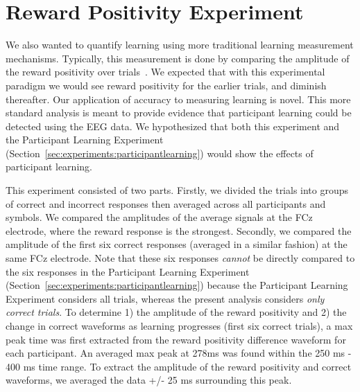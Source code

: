 \section{Reward Positivity Experiment}
\label{sec:experiments:rewpos}
We also wanted to quantify learning using more traditional learning measurement 
mechanisms. Typically, this measurement is done by comparing the amplitude of 
the reward positivity over trials~\cite{williams2017application}. We expected 
that with this experimental paradigm we would see reward positivity for the 
earlier trials, and diminish thereafter. Our application of \tvt accuracy to 
measuring learning is novel.  This more standard analysis is meant to provide 
evidence that participant learning could be detected using the EEG data. We 
hypothesized that both this experiment and the Participant Learning Experiment 
(Section~\ref{sec:experiments:participantlearning}) would show the effects of 
participant learning.

This experiment consisted of two parts. Firstly, we divided the trials into 
groups of correct and incorrect responses then averaged across all participants 
and symbols. We compared the amplitudes of the average signals at the FCz 
electrode, where the reward response is the strongest. Secondly, we compared 
the amplitude of the first six correct responses (averaged in a similar 
fashion) at the same FCz electrode. Note that these six responses \emph{cannot} 
be directly compared to the six responses in the Participant Learning 
Experiment (Section~\ref{sec:experiments:participantlearning}) because the 
Participant Learning Experiment considers all trials, whereas the present 
analysis considers \emph{only correct trials}. To determine 1) the amplitude of 
the reward positivity and 2) the change in correct waveforms as learning 
progresses (first six correct trials), a max peak time was first extracted from 
the reward positivity difference waveform for each participant. An averaged max 
peak at 278ms was found within the 250 ms - 400 ms time range. To extract the 
amplitude of the reward positivity and correct waveforms, we  averaged the data 
+/- 25 ms surrounding this peak.
